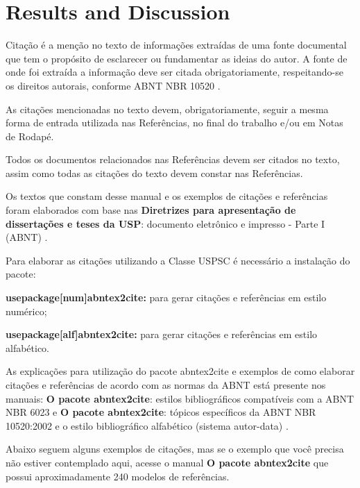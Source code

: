 

\chapter{Results and Discussion}
\label{ch:disc}
Citação é a menção no texto de informações extraídas de uma fonte documental que tem o propósito de esclarecer ou fundamentar as ideias do autor. A fonte de onde foi extraída a informação deve ser citada obrigatoriamente, respeitando-se os direitos autorais, conforme ABNT NBR 10520 \cite{nbr10520}.

As citações mencionadas no texto devem, obrigatoriamente, seguir a mesma forma de entrada utilizada nas Referências, no final do trabalho e/ou em Notas de Rodapé.

Todos os documentos relacionados nas Referências devem ser citados no texto, assim como todas as citações do texto devem constar nas Referências. 

Os textos que constam desse manual e os exemplos de citações e referências foram elaborados com base nas \textbf{Diretrizes para apresentação de dissertações e teses da USP}: documento eletrônico e impresso - Parte I (ABNT) \cite{sibi2009}.

Para elaborar as citações utilizando a Classe USPSC é necessário a instalação do pacote: 

\begin{alineas}
	\item \textbf{usepackage[num]abntex2cite:} para gerar citações e referências em estilo numérico;
	\item \textbf{usepackage[alf]abntex2cite:} para gerar citações e referências em estilo alfabético.
\end{alineas}

As explicações para utilização do pacote abntex2cite e exemplos de como elaborar citações e referências de acordo com as normas da ABNT está presente nos manuais: \textbf{O pacote abntex2cite}: estilos bibliográficos compatíveis com a ABNT NBR 6023 \cite{abnetxcite} e  \textbf{O pacote abntex2cite}: tópicos específicos da ABNT NBR 10520:2002 e o estilo bibliográfico alfabético (sistema autor-data) \cite{abnetxcitealf}.

Abaixo seguem alguns exemplos de citações, mas se o exemplo que você precisa não estiver contemplado aqui, acesse o manual \textbf{O pacote abntex2cite} que possui aproximadamente 240 modelos de referências.

